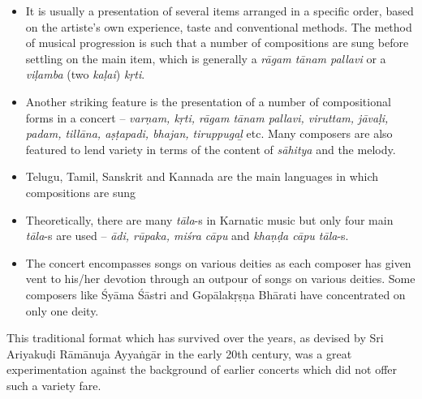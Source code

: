 \begin{itemize}
\itemsep=0pt

 \item It is usually a presentation of several items arranged in a specific order, based on the artiste’s own experience, taste and conventional methods. The method of musical progression is such that a number of compositions are sung before settling on the main item, which is generally a \textit{rāgam tānam pallavi} or a \textit{viḷamba} (two \textit{kaḷai}) \textit{kṛti}.

 \item Another striking feature is the presentation of a number of compositional forms in a concert – \textit{varṇam, kṛti, rāgam tānam pallavi, viruttam, jāvaḷi, padam, tillāna, aṣṭapadi, bhajan, tiruppugaḻ} etc. Many composers are also featured to lend variety in terms of the content of \textit{sāhitya} and the melody.

 \item Telugu, Tamil, Sanskrit and Kannada are the main languages in which compositions are sung

 \item Theoretically, there are many \textit{tāla}-s in Karnatic music but only four main \textit{tāla}-s are used – \textit{ādi, rūpaka, miśra cāpu} and \textit{khaṇḍa cāpu tāla}-s.

 \item The concert encompasses songs on various deities as each composer has given vent to his/her devotion through an outpour of songs on various deities. Some composers like Śyāma Śāstri and Gopālakṛṣṇa Bhārati have concentrated on only one deity.

\end{itemize}

This traditional format which has survived over the years, as devised by Sri Ariyakuḍi Rāmānuja Ayyaṅgār in the early 20th century, was a great experimentation against the background of earlier concerts which did not offer such a variety fare.

